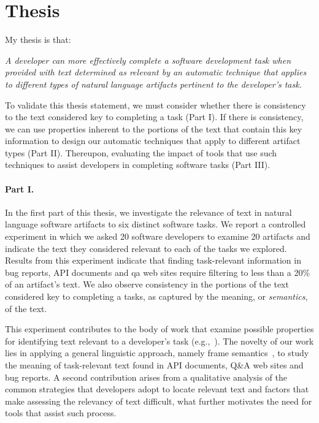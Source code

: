 

\section{Thesis}
\label{cp1:thesis}


My thesis is that:




\medskip
\begin{bluequote}
    \textit{A developer can more effectively complete a software development task when  provided
    with text  determined as relevant 
    by an automatic technique that applies to 
    different types of natural language artifacts pertinent to the developer's task.}
\end{bluequote}




To validate this thesis statement, 
we must consider whether there is consistency to 
the text considered key to completing a task (Part I).
If there is consistency, we can use properties inherent 
to the portions of the text that contain this key information 
to design our automatic techniques that apply to 
different artifact types (Part II).
Thereupon, evaluating the impact of tools that use such techniques to assist developers in completing software tasks (Part III). 






\paragraph{\textbf{Part I.}} 


In the first part of this thesis, we investigate the relevance of text in natural language software artifacts
to six distinct software tasks.
We report a controlled experiment in which we asked 20 software developers to examine 20 artifacts
and indicate  the text they considered relevant to each of the tasks we explored.
Results from this experiment indicate that 
finding task-relevant information in bug
reports, API documents and \acf{qa} web sites require filtering
to less than a 20\% of an artifact's text.
We also observe consistency in 
the portions of the text 
considered key to completing a tasks, as captured by the meaning, or \textit{semantics}, of the
 text.


This experiment contributes to the body of work that examine possible properties for identifying text relevant to a developer's task (e.g.,~\cite{Forward2002, Jiang2016b, Robillard2015, Bavota2016}).
The novelty of our work lies in 
applying a general
linguistic approach, namely frame semantics~\cite{fillmore1976frame, Baker1998}, to study the meaning of task-relevant text found in 
API documents, Q\&A web sites and bug reports.
A second contribution arises from a qualitative analysis of
the common strategies that developers adopt to locate relevant text 
and factors that make assessing the relevancy of text difficult,
what further motivates the need for tools that assist such process.






